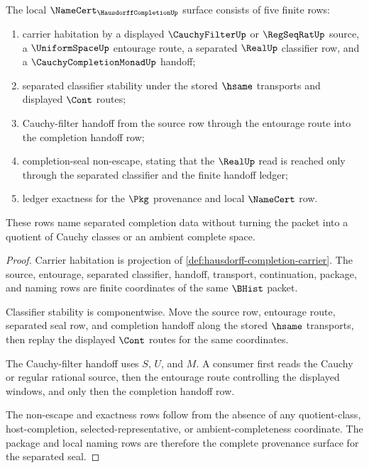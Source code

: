 \begin{theorem}
\label{thm:hausdorff-completion-namecert-obligations}
The local $\NameCert_{\HausdorffCompletionUp}$ surface consists of five finite rows:
\begin{enumerate}
\item carrier habitation by a displayed $\CauchyFilterUp$ or $\RegSeqRatUp$ source, a $\UniformSpaceUp$ entourage route, a separated $\RealUp$ classifier row, and a $\CauchyCompletionMonadUp$ handoff;
\item separated classifier stability under the stored $\hsame$ transports and displayed $\Cont$ routes;
\item Cauchy-filter handoff from the source row through the entourage route into the completion handoff row;
\item completion-seal non-escape, stating that the $\RealUp$ read is reached only through the separated classifier and the finite handoff ledger;
\item ledger exactness for the $\Pkg$ provenance and local $\NameCert$ row.
\end{enumerate}
These rows name separated completion data without turning the packet into a quotient of Cauchy classes or an ambient complete space.
\end{theorem}
\begin{proof}
Carrier habitation is projection of \autoref{def:hausdorff-completion-carrier}. The source, entourage, separated classifier, handoff, transport, continuation, package, and naming rows are finite coordinates of the same $\BHist$ packet.

Classifier stability is componentwise. Move the source row, entourage route, separated seal row, and completion handoff along the stored $\hsame$ transports, then replay the displayed $\Cont$ routes for the same coordinates.

The Cauchy-filter handoff uses $S$, $U$, and $M$. A consumer first reads the Cauchy or regular rational source, then the entourage route controlling the displayed windows, and only then the completion handoff row.

The non-escape and exactness rows follow from the absence of any quotient-class, host-completion, selected-representative, or ambient-completeness coordinate. The package and local naming rows are therefore the complete provenance surface for the separated seal.
\end{proof}

